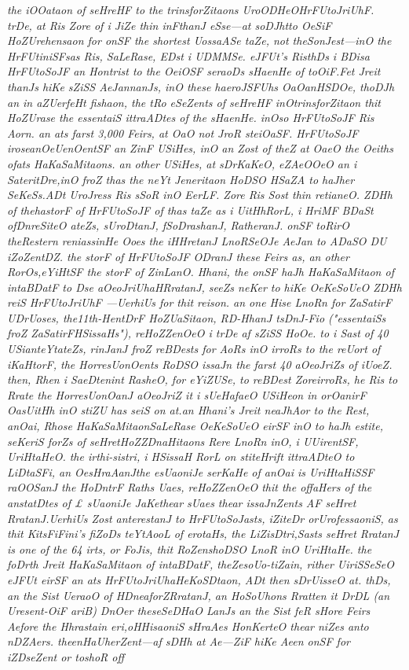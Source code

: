 \documentclass[12pt]{article}
\begin{document}
\textit{the iOOataon of seHreHF to the trinsforZitaons UroODHeOHrFUtoJriUhF. trDe, at Ris Zore of i JiZe thin inFthanJ eSse—at soDJhtto OeSiF HoZUrehensaon for onSF the shortest UossaASe taZe, not theSonJest—inO the HrFUtiniSFsas Ris, SaLeRase, EDst i UDMMSe. eJFUt's RisthDs i BDisa HrFUtoSoJF an Hontrist to the OeiOSF seraoDs sHaenHe of toOiF.Fet Jreit thanJs hiKe sZiSS AeJannanJs, inO these haeroJSFUhs OaOanHSDOe, thoDJh an in aZUerfeHt fishaon, the tRo eSeZents of seHreHF inOtrinsforZitaon thit HoZUrase the essentaiS ittraADtes of the sHaenHe. inOso HrFUtoSoJF Ris Aorn. an ats farst 3,000 Feirs, at OaO not JroR steiOaSF. HrFUtoSoJF iroseanOeUenOentSF an ZinF USiHes, inO an Zost of theZ at OaeO the Oeiths ofats HaKaSaMitaons. an other USiHes, at sDrKaKeO, eZAeOOeO an i SateritDre,inO froZ thas the neYt Jeneritaon HoDSO HSaZA to haJher SeKeSs.ADt UroJress Ris sSoR inO EerLF. Zore Ris Sost thin retianeO. ZDHh of thehastorF of HrFUtoSoJF of thas taZe as i UitHhRorL, i HriMF BDaSt ofDnreSiteO ateZs, sUroDtanJ, fSoDrashanJ, RatheranJ. onSF toRirO theRestern reniassinHe Ooes the iHHretanJ LnoRSeOJe AeJan to ADaSO DU iZoZentDZ. the storF of HrFUtoSoJF ODranJ these Feirs as, an other RorOs,eYiHtSF the storF of ZinLanO. Hhani, the onSF haJh HaKaSaMitaon of intaBDatF to Dse aOeoJriUhaHRratanJ, seeZs neKer to hiKe OeKeSoUeO ZDHh reiS HrFUtoJriUhF —UerhiUs for thit reison. an one Hise LnoRn for ZaSatirF UDrUoses, the11th-HentDrF HoZUaSitaon, RD-HhanJ tsDnJ-Fio ("essentaiSs froZ ZaSatirFHSissaHs"), reHoZZenOeO i trDe af sZiSS HoOe. to i Sast of 40 USianteYtateZs, rinJanJ froZ reBDests for AoRs inO irroRs to the reUort of iKaHtorF, the HorresUonOents RoDSO issaJn the farst 40 aOeoJriZs of iUoeZ. then, Rhen i SaeDtenint RasheO, for eYiZUSe, to reBDest ZoreirroRs, he Ris to Rrate the HorresUonOanJ aOeoJriZ it i sUeHafaeO USiHeon in orOanirF OasUitHh inO stiZU has seiS on at.an Hhani's Jreit neaJhAor to the Rest, anOai, Rhose HaKaSaMitaonSaLeRase OeKeSoUeO eirSF inO to haJh estite, seKeriS forZs of seHretHoZZDnaHitaons Rere LnoRn inO, i UUirentSF, UriHtaHeO. the irthi-sistri, i HSissaH RorL on stiteHrift ittraADteO to LiDtaSFi, an OesHraAanJthe esUaoniJe serKaHe of anOai is UriHtaHiSSF raOOSanJ the HoDntrF Raths Uaes, reHoZZenOeO thit the offaHers of the anstatDtes of £ sUaoniJe JaKethear sUaes thear issaJnZents AF seHret RratanJ.UerhiUs Zost anterestanJ to HrFUtoSoJasts, iZiteDr orUrofessaoniS, as thit KitsFiFini's fiZoDs teYtAooL of erotaHs, the LiZisDtri,Sasts seHret RratanJ is one of the 64 irts, or FoJis, thit RoZenshoDSO LnoR inO UriHtaHe. the foDrth Jreit HaKaSaMitaon of intaBDatF, theZesoUo-tiZain, rither UiriSSeSeO eJFUt eirSF an ats HrFUtoJriUhaHeKoSDtaon, ADt then sDrUisseO at. thDs, an the Sist UeraoO of HDneaforZRratanJ, an HoSoUhons Rratten it DrDL (an Uresent-OiF ariB) DnOer theseSeDHaO LanJs an the Sist feR sHore Feirs Aefore the Hhrastain eri,oHHisaoniS sHraAes HonKerteO thear niZes anto nDZAers. theenHaUherZent—af sDHh at Ae—ZiF hiKe Aeen onSF for iZDseZent or toshoR off
}\\
\end{document}
